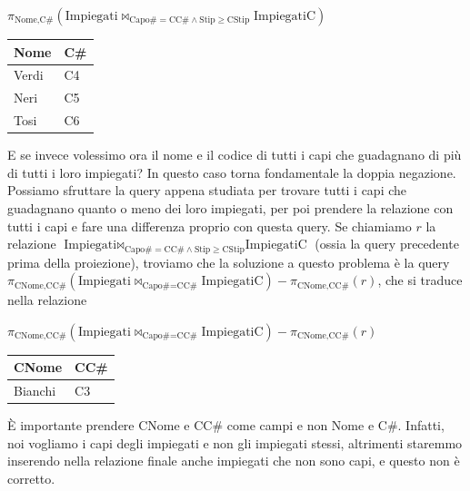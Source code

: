 \documentclass[11pt, a4paper, titlepage, oneside]{scrbook}
\begin{document}
\begin{center}
            $\pi_{\text{Nome}, \text{C\#}}(\text{Impiegati}\bowtie_{\text{Capo\#} = \text{CC\#} \land \text{Stip} \geq \text{CStip}}\text{ImpiegatiC})$

\begin{tabular}{|l|l|}
\hline
\textbf{Nome} & \textbf{C\#}  \\ \hline
Verdi & C4  \\
Neri & C5 \\
Tosi & C6  \\ \hline
\end{tabular}
\end{center}

E se invece volessimo ora il nome e il codice di tutti i capi che guadagnano di più di tutti i loro impiegati? In questo caso torna fondamentale la doppia negazione. Possiamo sfruttare la query appena studiata per trovare tutti i capi che guadagnano quanto o meno dei loro impiegati, per poi prendere la relazione con tutti i capi e fare una differenza proprio con questa query. Se chiamiamo $r$ la relazione $\text{Impiegati}\bowtie_{\text{Capo\#} = \text{CC\#} \land \text{Stip} \geq \text{CStip}}\text{ImpiegatiC}$ (ossia la query precedente prima della proiezione), troviamo che la soluzione a questo problema è la query $\pi_{\text{CNome}, \text{CC\#}}(\text{Impiegati}\bowtie_{\text{Capo\#} = \text{CC\#}}\text{ImpiegatiC}) - \pi_{\text{CNome}, \text{CC\#}}(r)$, che si traduce nella relazione

\begin{center}
            $\pi_{\text{CNome}, \text{CC\#}}(\text{Impiegati}\bowtie_{\text{Capo\#} = \text{CC\#}}\text{ImpiegatiC}) - \pi_{\text{CNome}, \text{CC\#}}(r)$

\begin{tabular}{|l|l|}
\hline
\textbf{CNome} & \textbf{CC\#}  \\ \hline
Bianchi & C3  \\ \hline
\end{tabular}
\end{center}

\NB È importante prendere CNome e CC\# come campi e non Nome e C\#. Infatti, noi vogliamo i capi degli impiegati e non gli impiegati stessi, altrimenti staremmo inserendo nella relazione finale anche impiegati che non sono capi, e questo non è corretto.
\end{document}
